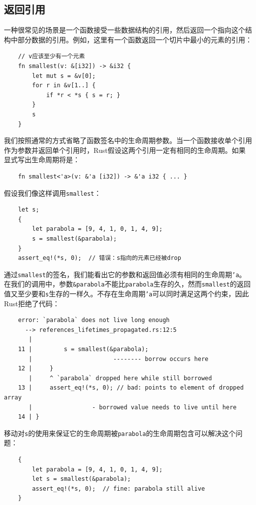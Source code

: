 \subsection{返回引用}
一种很常见的场景是一个函数接受一些数据结构的引用，然后返回一个指向这个结构中部分数据的引用。例如，这里有一个函数返回一个切片中最小的元素的引用：
\begin{verbatim}
    // v应该至少有一个元素
    fn smallest(v: &[i32]) -> &i32 {
        let mut s = &v[0];
        for r in &v[1..] {
            if *r < *s { s = r; }
        }
        s
    }
\end{verbatim}

我们按照通常的方式省略了函数签名中的生命周期参数。当一个函数接收单个引用作为参数并返回单个引用时，Rust假设这两个引用一定有相同的生命周期。如果显式写出生命周期将是：
\begin{verbatim}
    fn smallest<'a>(v: &'a [i32]) -> &'a i32 { ... }
\end{verbatim}

假设我们像这样调用\texttt{smallest}：
\begin{verbatim}
    let s;
    {
        let parabola = [9, 4, 1, 0, 1, 4, 9];
        s = smallest(&parabola);
    }
    assert_eq!(*s, 0);  // 错误：s指向的元素已经被drop
\end{verbatim}

通过\texttt{smallest}的签名，我们能看出它的参数和返回值必须有相同的生命周期\texttt{'a}。在我们的调用中，参数\texttt{\&parabola}不能比\texttt{parabola}生存的久，然而\texttt{smallest}的返回值又至少要和\texttt{s}生存的一样久。不存在生命周期\texttt{'a}可以同时满足这两个约束，因此Rust拒绝了代码：
\begin{verbatim}
    error: `parabola` does not live long enough
      --> references_lifetimes_propagated.rs:12:5
       |
    11 |         s = smallest(&parabola);
       |                       -------- borrow occurs here
    12 |     }
       |     ^ `parabola` dropped here while still borrowed
    13 |     assert_eq!(*s, 0); // bad: points to element of dropped array
       |                 - borrowed value needs to live until here
    14 | }
\end{verbatim}

移动对\texttt{s}的使用来保证它的生命周期被\texttt{parabola}的生命周期包含可以解决这个问题：
\begin{verbatim}
    {
        let parabola = [9, 4, 1, 0, 1, 4, 9];
        let s = smallest(&parabola);
        assert_eq!(*s, 0);  // fine: parabola still alive
    }
\end{verbatim}

